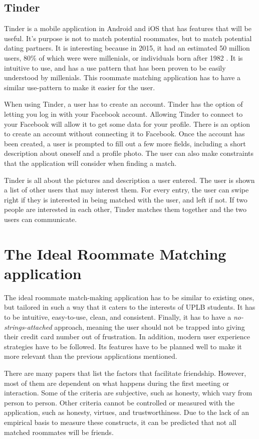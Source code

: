 \documentclass[journal]{./IEEE/IEEEtran}
\begin{document}
\subsection{Tinder}
Tinder is a mobile application in Android and iOS that has features that will be useful. It's purpose is not to match potential roommates, but to match potential dating partners. It is interesting because in 2015, it had an estimated 50 million users\cite{tinderstat2}, 80\% of which were were millenials, or individuals born after 1982 \cite{tinderstat}\cite{millenial}. It is intuitive to use, and has a use pattern that has been proven to be easily understood by millenials. This roommate matching application has to have a similar use-pattern to make it easier for the user.

When using Tinder, a user has to create an account. Tinder has the option of letting you log in with your Facebook account. Allowing Tinder to connect to your Facebook will allow it to get some data for your profile. There is an option to create an account without connecting it to Facebook. Once the account has been created, a user is prompted to fill out a few more fields, including a short description about oneself and a profile photo. The user can also make constraints that the application will consider when finding a match.

Tinder is all about the pictures and description a user entered. The user is shown a list of other users that may interest them. For every entry, the user can swipe right if they is interested in being matched with the user, and left if not. If two people are interested in each other, Tinder matches them together and the two users can communicate.

\section{The Ideal Roommate Matching application}
The ideal roommate match-making application has to be similar to existing ones, but tailored in such a way that it caters to the interests of UPLB students. It has to be intuitive, easy-to-use, clean, and consistent. Finally, it has to have a \textit{no-strings-attached} approach, meaning the user should not be trapped into giving their credit card number out of frustration. In addition, modern user experience strategies have to be followed. Its features have to be planned well to make it more relevant than the previous applications mentioned.

There are many papers that list the factors that facilitate friendship. However, most of them are dependent on what happens during the first meeting or interaction. Some of the criteria are subjective, such as honesty, which  vary from person to person. Other criteria cannot be controlled or measured with the application, such as honesty, virtues, and trustworthiness. Due to the lack of an empirical basis to measure these constructs, it can be predicted that not all matched roommates will be friends.
\end{document}
